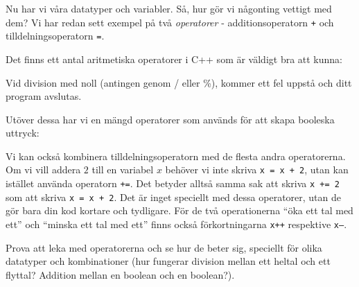 Nu har vi våra datatyper och variabler. Så, hur gör vi någonting vettigt med dem? Vi har redan sett exempel på två \emph{operatorer} - additionsoperatorn \texttt{+} och tilldelningsoperatorn \texttt{=}.

Det finns ett antal aritmetiska operatorer i C++ som är väldigt bra att kunna:



Vid division med noll (antingen genom / eller \%), kommer ett fel uppstå och ditt program avslutas.

Utöver dessa har vi en mängd operatorer som används för att skapa booleska uttryck:



Vi kan också kombinera tilldelningsoperatorn med de flesta andra operatorerna. Om vi vill addera $2$ till en variabel $x$ behöver vi inte skriva \texttt{x = x + 2}, utan kan istället använda operatorn \texttt{+=}. Det betyder alltså samma sak att skriva \texttt{x += 2} som att skriva \texttt{x = x + 2}. Det är inget speciellt med dessa operatorer, utan de gör bara din kod kortare och tydligare. För de två operationerna ``öka ett tal med ett'' och ``minska ett tal med ett'' finns också förkortningarna \texttt{x++} respektive \texttt{x--}.

Prova att leka med operatorerna och se hur de beter sig, speciellt för olika datatyper och kombinationer (hur fungerar division mellan ett heltal och ett flyttal? Addition mellan en boolean och en boolean?).
